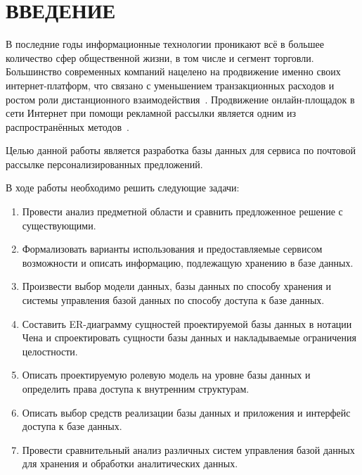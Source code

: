 \chapter*{ВВЕДЕНИЕ}

В последние годы информационные технологии проникают всё в большее количество сфер общественной жизни, в том числе и сегмент торговли. Большинство современных компаний нацелено на продвижение именно своих интернет-платформ, что связано с уменьшением транзакционных расходов и ростом роли дистанционного взаимодействия~\cite{bib1}. Продвижение онлайн-площадок в сети Интернет при помощи рекламной рассылки является одним из распространённых методов~\cite{bib4}.

Целью данной работы является разработка базы данных для сервиса по почтовой рассылке персонализированных предложений.

В ходе работы необходимо решить следующие задачи:
\begin{enumerate}
	\item Провести анализ предметной области и сравнить предложенное решение с существующими.
	\item Формализовать варианты использования и предоставляемые сервисом возможности и описать информацию, подлежащую хранению в базе данных.
	\item Произвести выбор модели данных, базы данных по способу хранения и системы управления базой данных по способу доступа к базе данных.
	\item Составить ER-диаграмму сущностей проектируемой базы данных в нотации Чена и спроектировать сущности базы данных и накладываемые ограничения целостности.
	\item Описать проектируемую ролевую модель на уровне базы данных и определить права доступа к внутренним структурам.
	\item Описать выбор средств реализации базы данных и приложения и  интерфейс доступа к базе данных.
	\item Провести сравнительный анализ различных систем управления базой данных для хранения и обработки аналитических данных.
\end{enumerate}